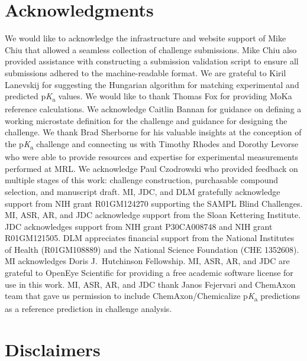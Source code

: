 \documentclass[9pt,lineno,final]{elife}
\newcommand{\pKa}{p\textit{K}\textsubscript{a}}
\begin{document}
\section{Acknowledgments}

We would like to acknowledge the infrastructure and website support of Mike Chiu that allowed a seamless collection of challenge submissions. 
Mike Chiu also provided assistance with constructing a submission validation script to ensure all submissions adhered to the machine-readable format. 
We are grateful to Kiril Lanevskij for suggesting the Hungarian algorithm for matching experimental and predicted \pKa{} values. 
We would like to thank Thomas Fox for providing MoKa reference calculations.
We acknowledge Caitlin Bannan for guidance on defining a working microstate definition for the challenge and guidance for designing the challenge. 
We thank Brad Sherborne for his valuable insights at the conception of the \pKa{} challenge and connecting us with Timothy Rhodes and Dorothy Levorse who were able to provide resources and expertise for experimental measurements performed at MRL. 
We acknowledge Paul Czodrowski who provided feedback on multiple stages of this work: challenge construction, purchasable compound selection, and manuscript draft. 
MI, JDC, and DLM gratefully acknowledge support from NIH grant R01GM124270 supporting the SAMPL Blind Challenges.
MI, ASR, AR, and JDC acknowledge support from the Sloan Kettering Institute.
JDC acknowledges support from NIH grant P30CA008748 and NIH grant R01GM121505. 
DLM appreciates financial support from the National Institutes of Health (R01GM108889) and the National Science Foundation (CHE 1352608).
MI acknowledges Doris J.\ Hutchinson Fellowship. 
MI, ASR, AR, and JDC are grateful to OpenEye Scientific for providing a free academic software license for use in this work.
MI, ASR, AR, and JDC thank Janos Fejervari and ChemAxon team that gave us permission to include ChemAxon/Chemicalize \pKa{} predictions as a reference prediction in challenge analysis. 


\section{Disclaimers}
\end{document}

